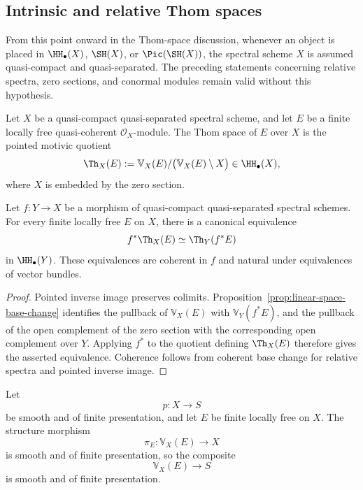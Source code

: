 \subsection{Intrinsic and relative Thom spaces}

From this point onward in the Thom-space discussion, whenever an object is
placed in \(\HH_\bullet(X)\), \(\SH(X)\), or
\(\Pic(\SH(X))\), the spectral scheme \(X\) is assumed quasi-compact and
quasi-separated.  The preceding statements concerning relative spectra,
zero sections, and conormal modules remain valid without this hypothesis.

\begin{definition}
\label{def:intrinsic-thom}
Let \(X\) be a quasi-compact quasi-separated spectral scheme, and let \(E\)
be a finite locally free quasi-coherent \(\mathcal O_X\)-module.  The Thom
space of \(E\) over \(X\) is the pointed motivic quotient
\[
    \Th_X(E)
    :=
    \mathbb V_X(E)/
    \bigl(
      \mathbb V_X(E)\setminus X
    \bigr)
    \in
    \HH_\bullet(X),
\]
where \(X\) is embedded by the zero section.
\end{definition}

\begin{proposition}
\label{prop:thom-base-change-unstable}
Let $f:Y\to X$ be a morphism of quasi-compact quasi-separated spectral schemes.  For every finite
locally free $E$ on $X$, there is a canonical equivalence
\[
    f^*\Th_X(E)
    \simeq
    \Th_Y(f^*E)
\]
in $\HH_\bullet(Y)$.  These equivalences are coherent in $f$ and natural under equivalences of
vector bundles.
\end{proposition}

\begin{proof}
Pointed inverse image preserves colimits.  Proposition~\ref{prop:linear-space-base-change}
identifies the pullback of $\mathbb V_X(E)$ with $\mathbb V_Y(f^*E)$, and the pullback of the open
complement of the zero section with the corresponding open complement over $Y$.  Applying $f^*$
to the quotient defining $\Th_X(E)$ therefore gives the asserted equivalence.  Coherence follows
from coherent base change for relative spectra and pointed inverse image.
\end{proof}

Let
\[
    p:X\longrightarrow S
\]
be smooth and of finite presentation, and let \(E\) be finite locally free on
\(X\).  The structure morphism
\[
    \pi_E:\mathbb V_X(E)\longrightarrow X
\]
is smooth and of finite presentation, so the composite
\[
    \mathbb V_X(E)\longrightarrow S
\]
is smooth and of finite presentation.


